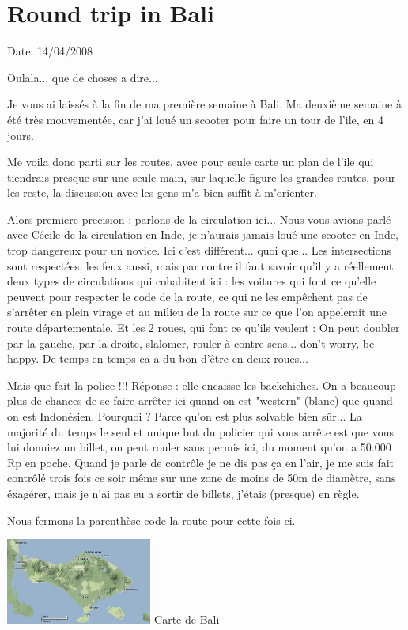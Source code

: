\section{Round trip in Bali}

Date: 14/04/2008

\begin{multicols}{2}

Oulala... que de choses a dire...

Je vous ai laissés à la fin de ma première semaine à Bali. Ma deuxième semaine à été très mouvementée, car j'ai loué un scooter pour faire un tour de l'ile, en 4 jours.

Me voila donc parti sur les routes, avec pour seule carte un plan de l'ile qui tiendrais presque sur une seule main, sur laquelle figure les grandes routes, pour les reste, la discussion avec les gens m'a bien suffit à m'orienter.

Alors premiere precision : parlons de la circulation ici... Nous vous avions parlé avec Cécile de la circulation en Inde, je n'aurais jamais loué une scooter en Inde, trop dangereux pour un novice. Ici c'est différent... quoi que... Les intersections sont respectées, les feux aussi, mais par contre il faut savoir qu'il y a réellement deux types de circulations qui cohabitent ici : les voitures qui font ce qu'elle peuvent pour respecter le code de la route, ce qui ne les empêchent pas de s'arrêter en plein virage et au milieu de la route sur ce que l'on appelerait une route départementale. Et les 2 roues, qui font ce qu'ils veulent : On peut doubler par la gauche, par la droite, slalomer, rouler à contre sens... don't worry, be happy. De temps en temps ca a du bon d'être en deux roues...

Mais que fait la police !!! Réponse : elle encaisse les backchiches. On a beaucoup plus de chances de se faire arrêter ici quand on est "western" (blanc) que quand on est Indonésien. Pourquoi ? Parce qu'on est plus solvable bien sûr... La majorité du temps le seul et unique but du policier qui vous arrête est que vous lui donniez un billet, on peut rouler sans permis ici, du moment qu'on a 50.000 Rp en poche. Quand je parle de contrôle je ne dis pas ça en l'air, je me suis fait contrôlé trois fois ce soir même sur une zone de moins de 50m de diamètre, sans éxagérer, mais je n'ai pas eu a sortir de billets, j'étais (presque) en règle.

Nous fermons la parenthèse code la route pour cette fois-ci.

\hspace*{-0.65cm}
\includegraphics[width=4.8cm]{articles/Round-trip-in-bali/1208257310r6gK.jpg}
Carte de Bali



\end{multicols}
